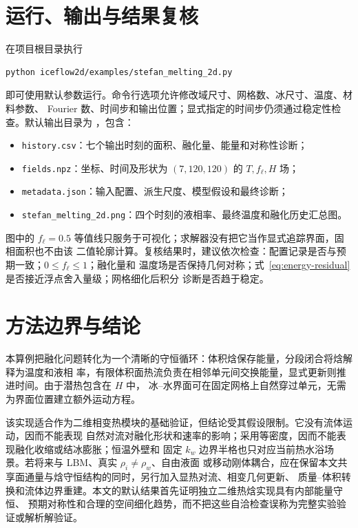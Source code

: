 \documentclass[UTF8,11pt]{ctexart}
\numberwithin{equation}{section}
\newcommand{\fl}{f_{\ell}}
\newcommand{\code}[1]{\texttt{#1}}
\begin{document}
\section{运行、输出与结果复核}

在项目根目录执行
\begin{lstlisting}[style=iceflowcode]
python iceflow2d/examples/stefan_melting_2d.py
\end{lstlisting}
即可使用默认参数运行。命令行选项允许修改域尺寸、网格数、冰尺寸、温度、材料参数、
Fourier 数、时间步和输出位置；显式指定的时间步仍须通过稳定性检查。默认输出目录为
，包含：
\begin{itemize}
      \item \code{history.csv}：七个输出时刻的面积、融化量、能量和对称性诊断；
      \item \code{fields.npz}：坐标、时间及形状为 $(7,120,120)$ 的 $T,\fl,H$ 场；
      \item \code{metadata.json}：输入配置、派生尺度、模型假设和最终诊断；
      \item \code{stefan\_melting\_2d.png}：四个时刻的液相率、最终温度和融化历史汇总图。
\end{itemize}
图中的 $\fl=0.5$ 等值线只服务于可视化；求解器没有把它当作显式追踪界面，固相面积也不由该
二值轮廓计算。复核结果时，建议依次检查：配置记录是否与预期一致；$0\le\fl\le1$；融化量和
温度场是否保持几何对称；式~\eqref{eq:energy-residual} 是否接近浮点舍入量级；网格细化后积分
诊断是否趋于稳定。

\section{方法边界与结论}

本算例把融化问题转化为一个清晰的守恒循环：体积焓保存能量，分段闭合将焓解释为温度和液相
率，有限体积面热流负责在相邻单元间交换能量，显式更新则推进时间。由于潜热包含在 $H$ 中，
冰--水界面可在固定网格上自然穿过单元，无需为界面位置建立额外运动方程。

该实现适合作为二维相变热模块的基础验证，但结论受其假设限制。它没有流体运动，因而不能表现
自然对流对融化形状和速率的影响；采用等密度，因而不能表现融化收缩或结冰膨胀；恒温外壁和
固定 $k_w$ 边界半格也只对应当前热水浴场景。若将来与 LBM、真实 $\rho_i\ne\rho_w$、自由液面
或移动刚体耦合，应在保留本文共享面通量与焓守恒结构的同时，另行加入显热对流、相变几何更新、
质量--体积转换和流体边界重建。本文的默认结果首先证明独立二维热焓实现具有内部能量守恒、
预期对称性和合理的空间细化趋势，而不把这些自洽检查误称为完整实验验证或解析解验证。
\end{document}
